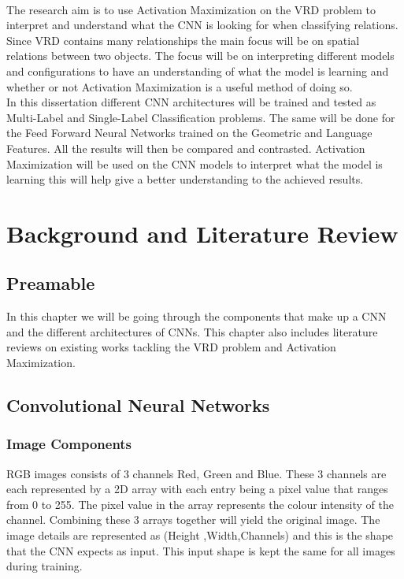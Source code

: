 \documentclass{csfyp}
\newcommand\tab[1][1cm]{\hspace*{#1}}
\begin{document}
\\
\tab
The research aim is to use Activation Maximization on the VRD problem to interpret and understand what the CNN is looking for when classifying relations. Since VRD contains many relationships the main focus will be on spatial relations between two objects. The focus will be on interpreting different models and configurations to have an understanding of what the model is learning and whether or not Activation Maximization is a useful method of doing so.
\\
\tab In this dissertation different CNN architectures will be trained and tested as Multi-Label and Single-Label Classification problems. The same will be done for the Feed Forward Neural Networks trained on the Geometric and Language Features. All the results will then be compared and contrasted. Activation Maximization will be used on the CNN models to interpret what the model is learning this will help give a better understanding to the achieved results.

\section{Background and Literature Review}
\subsection{Preamable}
In this chapter we will be going through the components that make up a CNN and the different architectures of CNNs. This chapter also includes literature reviews on existing works tackling the VRD problem and Activation Maximization.

\subsection{Convolutional Neural Networks}
\subsubsection{Image Components}
RGB images consists of 3 channels Red, Green and Blue. These 3 channels are each represented by a 2D array with each entry being a pixel value that ranges from 0 to 255. The pixel value in the array represents the colour intensity of the channel. Combining these 3 arrays together will yield the original image. The image details are represented as (Height ,Width,Channels) and this is the shape that the CNN expects as input. This input shape is kept the same for all images during training.
\end{document}
